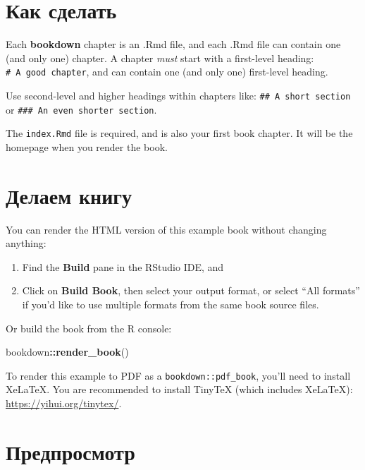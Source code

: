 \documentclass[
  12pt,
  a4paper,
]{book}
\newenvironment{Shaded}{\begin{snugshade}}{\end{snugshade}}
\newcommand{\FunctionTok}[1]{\textcolor[rgb]{0.13,0.29,0.53}{\textbf{#1}}}
\newcommand{\NormalTok}[1]{#1}
\newcommand{\SpecialCharTok}[1]{\textcolor[rgb]{0.81,0.36,0.00}{\textbf{#1}}}
\theoremstyle{definition}
\theoremstyle{definition}
\theoremstyle{definition}
\theoremstyle{definition}
\theoremstyle{remark}
\begin{document}
\section{Как сделать}\label{ux43aux430ux43a-ux441ux434ux435ux43bux430ux442ux44c}

Each \textbf{bookdown} chapter is an .Rmd file, and each .Rmd file can contain one (and only one) chapter. A chapter \emph{must} start with a first-level heading: \texttt{\#\ A\ good\ chapter}, and can contain one (and only one) first-level heading.

Use second-level and higher headings within chapters like: \texttt{\#\#\ A\ short\ section} or \texttt{\#\#\#\ An\ even\ shorter\ section}.

The \texttt{index.Rmd} file is required, and is also your first book chapter. It will be the homepage when you render the book.

\section{Делаем книгу}\label{ux434ux435ux43bux430ux435ux43c-ux43aux43dux438ux433ux443}

You can render the HTML version of this example book without changing anything:

\begin{enumerate}
\def\labelenumi{\arabic{enumi}.}
\item
  Find the \textbf{Build} pane in the RStudio IDE, and
\item
  Click on \textbf{Build Book}, then select your output format, or select ``All formats'' if you'd like to use multiple formats from the same book source files.
\end{enumerate}

Or build the book from the R console:

\begin{Shaded}
\begin{Highlighting}[]
\NormalTok{bookdown}\SpecialCharTok{::}\FunctionTok{render\_book}\NormalTok{()}
\end{Highlighting}
\end{Shaded}

To render this example to PDF as a \texttt{bookdown::pdf\_book}, you'll need to install XeLaTeX. You are recommended to install TinyTeX (which includes XeLaTeX): \url{https://yihui.org/tinytex/}.

\section{Предпросмотр}\label{ux43fux440ux435ux434ux43fux440ux43eux441ux43cux43eux442ux440}
\end{document}
